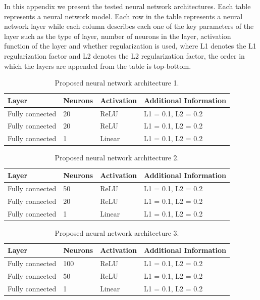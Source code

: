\documentclass[preprint,12pt]{elsarticle}%
\begin{document}
In this appendix we present the tested neural network architectures. Each table represents a neural network model. Each row in the table represents a neural network layer while each column describes each one of the key parameters of the layer such as the type of layer, number of neurons in the layer, activation function of the layer and whether regularization is used, where L1 denotes the L1 regularization factor and L2 denotes the L2 regularization factor, the order in which the layers are appended from the table is top-bottom.

\begin{table}[H]
\centering
\caption{Proposed neural network architecture 1.}%
\begin{tabular}
[c]{llll}\hline
Layer & Neurons & Activation & Additional Information\\\hline
Fully connected & 20 & ReLU & L1 = 0.1, L2 = 0.2\\
Fully connected & 20 & ReLU & L1 = 0.1, L2 = 0.2\\
Fully connected & 1 & Linear & L1 = 0.1, L2 = 0.2\\\hline
\end{tabular}
\label{table:proposed_nn_1}%
\end{table}

\begin{table}[H]
\centering
\caption{Proposed neural network architecture 2.}%
\begin{tabular}
[c]{llll}\hline
Layer & Neurons & Activation & Additional Information\\\hline
Fully connected & 50 & ReLU & L1 = 0.1, L2 = 0.2\\
Fully connected & 20 & ReLU & L1 = 0.1, L2 = 0.2\\
Fully connected & 1 & Linear & L1 = 0.1, L2 = 0.2\\\hline
\end{tabular}
\label{table:proposed_nn_2}%
\end{table}

\begin{table}[H]
\centering
\caption{Proposed neural network architecture 3.}%
\begin{tabular}
[c]{llll}\hline
Layer & Neurons & Activation & Additional Information\\\hline
Fully connected & 100 & ReLU & L1 = 0.1, L2 = 0.2\\
Fully connected & 50 & ReLU & L1 = 0.1, L2 = 0.2\\
Fully connected & 1 & Linear & L1 = 0.1, L2 = 0.2\\\hline
\end{tabular}
\label{table:proposed_nn_3}%
\end{table}
\end{document}
